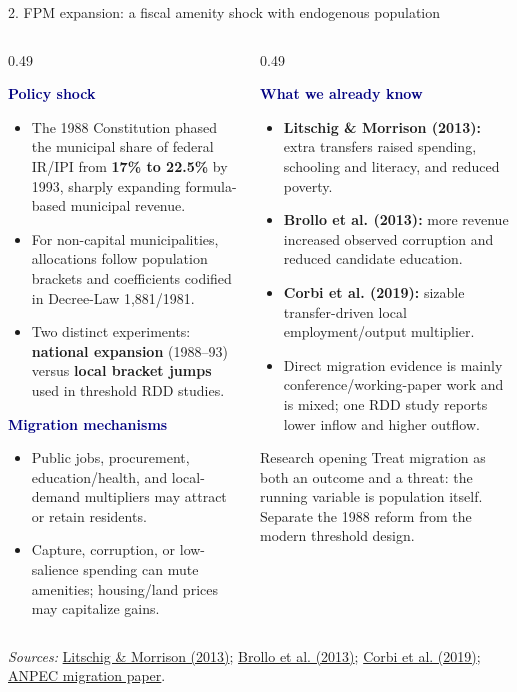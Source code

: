 \documentclass[aspectratio=169,10pt]{beamer}
\newcommand{\ShortSource}[1]{%
  \vfill\par\tiny\color{Muted}\textit{Sources:} #1}
\newcommand{\PolicyTag}[1]{%
  \colorbox{Sand}{\strut\textcolor{Navy}{\textbf{#1}}}}
\begin{document}
\begin{frame}{2. FPM expansion: a fiscal amenity shock with endogenous population}
\small
\begin{columns}[T,onlytextwidth]
\begin{column}{0.49\textwidth}
  \PolicyTag{Policy shock}
  \begin{itemize}\setlength\itemsep{0.28em}
    \item The 1988 Constitution phased the municipal share of federal IR/IPI from \textbf{17\% to 22.5\%} by 1993, sharply expanding formula-based municipal revenue.
    \item For non-capital municipalities, allocations follow population brackets and coefficients codified in Decree-Law 1,881/1981.
    \item Two distinct experiments: \textbf{national expansion} (1988--93) versus \textbf{local bracket jumps} used in threshold RDD studies.
  \end{itemize}
  \vspace{0.2em}
  \PolicyTag{Migration mechanisms}
  \begin{itemize}\setlength\itemsep{0.25em}
    \item Public jobs, procurement, education/health, and local-demand multipliers may attract or retain residents.
    \item Capture, corruption, or low-salience spending can mute amenities; housing/land prices may capitalize gains.
  \end{itemize}
\end{column}
\begin{column}{0.49\textwidth}
  \PolicyTag{What we already know}
  \begin{itemize}\setlength\itemsep{0.28em}
    \item \textbf{Litschig \& Morrison (2013):} extra transfers raised spending, schooling and literacy, and reduced poverty.
    \item \textbf{Brollo et al. (2013):} more revenue increased observed corruption and reduced candidate education.
    \item \textbf{Corbi et al. (2019):} sizable transfer-driven local employment/output multiplier.
    \item Direct migration evidence is mainly conference/working-paper work and is mixed; one RDD study reports lower inflow and higher outflow.
  \end{itemize}
  \begin{block}{Research opening}
    Treat migration as both an outcome and a threat: the running variable is population itself. Separate the 1988 reform from the modern threshold design.
  \end{block}
\end{column}
\end{columns}
\ShortSource{\href{https://doi.org/10.1257/app.5.4.206}{Litschig \& Morrison (2013)}; \href{https://doi.org/10.1257/aer.103.5.1759}{Brollo et al. (2013)}; \href{https://doi.org/10.1093/restud/rdy064}{Corbi et al. (2019)}; \href{https://www.anpec.org.br/encontro/2019/submissao/files_I/i12-c352774646be9eef49d2a1d4a639819a.pdf}{ANPEC migration paper}.}
\end{frame}
\end{document}
